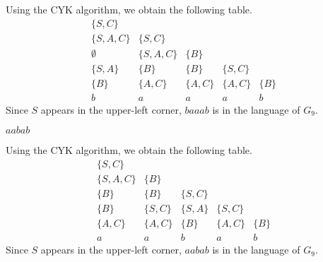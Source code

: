 \documentclass{exercise}
\begin{document}
  \begin{solution}
    Using the CYK algorithm, we obtain the following table.
    \[\begin{array}{|ccccc}
      \{S,C\} &&&&\\
      \{S,A,C\} & \{S,C\} &&&\\
      \emptyset & \{S,A,C\} & \{B\} &&\\
      \{S,A\} & \{B\} & \{B\} & \{S,C\}\\
      \{B\} & \{A,C\} & \{A,C\} & \{A,C\} & \{B\}\\
      \hline
      b & a & a & a & b
    \end{array}\]
    Since $S$ appears in the upper-left corner, $baaab$ is in the language of $G_9$.
  \end{solution}

\subtask $aabab$
  \begin{solution}
    Using the CYK algorithm, we obtain the following table.
    \[\begin{array}{|ccccc}
      \{S,C\} &&&& \\
      \{S,A,C\} & \{B\} &&&\\
      \{B\} & \{B\} & \{S,C\} &&\\
      \{B\} & \{S,C\} & \{S,A\} & \{S,C\}\\
      \{A,C\} & \{A,C\} & \{B\} & \{A,C\} & \{B\}\\
      \hline
      a & a & b & a & b
    \end{array}\]
    Since $S$ appears in the upper-left corner, $aabab$ is in the language of $G_9$.
  \end{solution}
\end{document}

